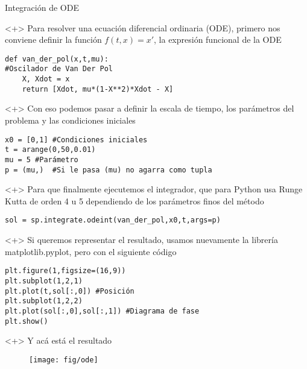 \documentclass{beamer}
\begin{document}
\begin{frame}[fragile]{Integración de ODE}
\begin{onlyenv}<+>
Para resolver una ecuación diferencial ordinaria (ODE), primero nos conviene definir la función $f(t,x) = x'$, la expresión funcional de la ODE
\begin{verbatim}
def van_der_pol(x,t,mu):
#Oscilador de Van Der Pol
    X, Xdot = x 
    return [Xdot, mu*(1-X**2)*Xdot - X]
\end{verbatim}
\end{onlyenv}
\begin{onlyenv}<+>
    Con eso podemos pasar a definir la escala de tiempo, los parámetros del problema y las condiciones iniciales

\begin{verbatim}
x0 = [0,1] #Condiciones iniciales
t = arange(0,50,0.01)
mu = 5 #Parámetro
p = (mu,)  #Si le pasa (mu) no agarra como tupla
\end{verbatim}

\end{onlyenv}
\begin{onlyenv}<+>
   Para que finalmente ejecutemos el integrador, que para Python usa Runge Kutta de orden 4 u 5 dependiendo de los parámetros finos del método
   \begin{verbatim}
sol = sp.integrate.odeint(van_der_pol,x0,t,args=p)
   \end{verbatim}
\end{onlyenv}

\begin{onlyenv}<+>
Si queremos representar el resultado, usamos nuevamente la librería matplotlib.pyplot, pero con el siguiente código
\begin{verbatim}
plt.figure(1,figsize=(16,9))
plt.subplot(1,2,1)
plt.plot(t,sol[:,0]) #Posición
plt.subplot(1,2,2)
plt.plot(sol[:,0],sol[:,1]) #Diagrama de fase
plt.show()
\end{verbatim}
\end{onlyenv}

\begin{onlyenv}<+>
Y acá está el resultado
\begin{figure}
  \centering
  \texttt{[image: fig/ode]}
  \label{fig:ode}
  \end{figure}
\end{onlyenv}

\end{frame}
\end{document}
